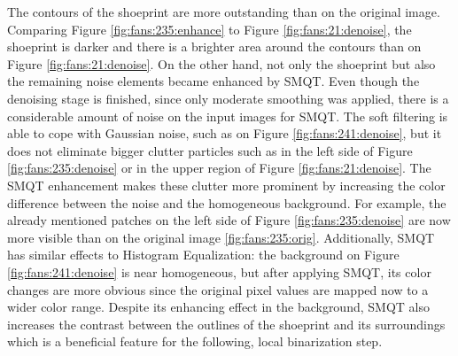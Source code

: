 \documentclass[draft,final]{vutinfth} %
\begin{document}
The contours of the shoeprint are more outstanding than on the original image.
Comparing Figure \ref{fig:fans:235:enhance} to Figure \ref{fig:fans:21:denoise}, the shoeprint is darker and there is a brighter area around the contours than on Figure \ref{fig:fans:21:denoise}.
On the other hand, not only the shoeprint but also the remaining noise elements became enhanced by SMQT.
Even though the denoising stage is finished, since only moderate smoothing was applied, there is a considerable amount of noise on the input images for SMQT.
The soft filtering is able to cope with Gaussian noise, such as on Figure \ref{fig:fans:241:denoise}, but it does not eliminate bigger clutter particles such as in the left side of Figure \ref{fig:fans:235:denoise} or in the upper region of Figure \ref{fig:fans:21:denoise}.
The SMQT enhancement makes these clutter more prominent by increasing the color difference between the noise and the homogeneous background.
For example, the already mentioned patches on the left side of Figure \ref{fig:fans:235:denoise} are now more visible than on the original image \ref{fig:fans:235:orig}.
Additionally, SMQT has similar effects to Histogram Equalization: the background on Figure \ref{fig:fans:241:denoise} is near homogeneous, but after applying SMQT, its color changes are more obvious since the original pixel values are mapped now to a wider color range.
Despite its enhancing effect in the background, SMQT also increases the contrast between the outlines of the shoeprint and its surroundings which is a beneficial feature for the following, local binarization step.
\end{document}

